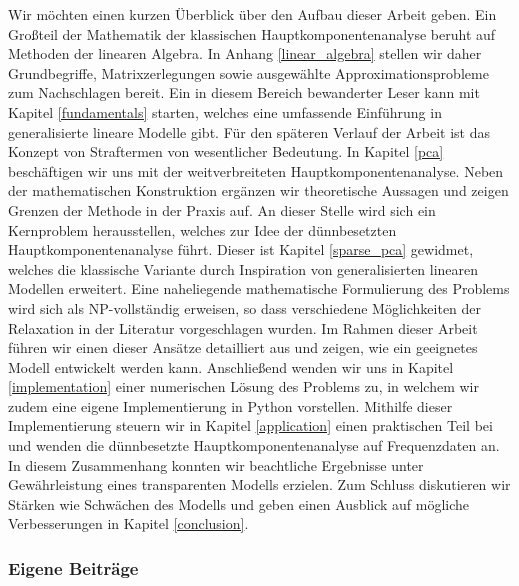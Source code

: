 Wir möchten einen kurzen Überblick über den Aufbau dieser Arbeit geben. Ein Großteil der Mathematik der klassischen Hauptkomponentenanalyse beruht auf Methoden der linearen Algebra. In Anhang \ref{linear_algebra} stellen wir daher Grundbegriffe, Matrixzerlegungen sowie ausgewählte Approximationsprobleme zum Nachschlagen bereit. Ein in diesem Bereich bewanderter Leser kann mit Kapitel \ref{fundamentals} starten, welches eine umfassende Einführung in generalisierte lineare Modelle gibt. Für den späteren Verlauf der Arbeit ist das Konzept von Straftermen von wesentlicher Bedeutung. In Kapitel \ref{pca} beschäftigen wir uns mit der weitverbreiteten Hauptkomponentenanalyse. Neben der mathematischen Konstruktion ergänzen wir theoretische Aussagen und zeigen Grenzen der Methode in der Praxis auf. An dieser Stelle wird sich ein Kernproblem herausstellen, welches zur Idee der dünnbesetzten Hauptkomponentenanalyse führt. Dieser ist Kapitel \ref{sparse_pca} gewidmet, welches die klassische Variante durch Inspiration von generalisierten linearen Modellen erweitert. Eine naheliegende mathematische Formulierung des Problems wird sich als NP-vollständig erweisen, so dass verschiedene Möglichkeiten der Relaxation in der Literatur vorgeschlagen wurden. Im Rahmen dieser Arbeit führen wir einen dieser Ansätze detailliert aus und zeigen, wie ein geeignetes Modell entwickelt werden kann. Anschließend wenden wir uns in Kapitel \ref{implementation} einer numerischen Lösung des Problems zu, in welchem wir zudem eine eigene Implementierung in Python vorstellen. Mithilfe dieser Implementierung steuern wir in Kapitel \ref{application} einen praktischen Teil bei und wenden die dünnbesetzte Hauptkomponentenanalyse auf Frequenzdaten an. In diesem Zusammenhang konnten wir beachtliche Ergebnisse unter Gewährleistung eines transparenten Modells erzielen. Zum Schluss diskutieren wir Stärken wie Schwächen des Modells und geben einen Ausblick auf mögliche Verbesserungen in Kapitel \ref{conclusion}.




\subsubsection{Eigene Beiträge}

